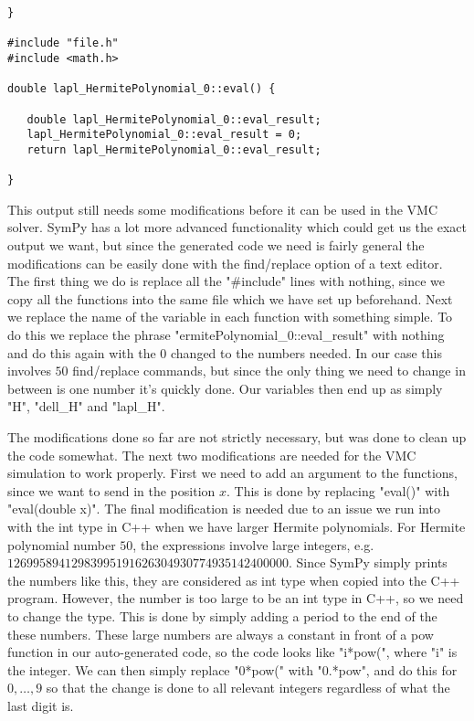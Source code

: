 \documentclass[../main.tex]{subfiles}
\begin{document}
\begin{appendices}
\begin{lstlisting}[caption={}, style=Bash]
}

#include "file.h"
#include <math.h>

double lapl_HermitePolynomial_0::eval() {

   double lapl_HermitePolynomial_0::eval_result;
   lapl_HermitePolynomial_0::eval_result = 0;
   return lapl_HermitePolynomial_0::eval_result;

}

\end{lstlisting}
This output still needs some modifications before it can be used in the VMC solver. SymPy has a lot more advanced functionality which could get us the exact output we want, but since the generated code we need is fairly general the modifications can be easily done with the find/replace option of a text editor. The first thing we do is replace all the "\#include" lines with nothing, since we copy all the functions into the same file which we have set up beforehand. Next we replace the name of the variable in each function with something simple. To do this we replace the phrase "ermitePolynomial\_0::eval\_result" with nothing and do this again with the $0$ changed to the numbers needed. In our case this involves $50$ find/replace commands, but since the only thing we need to change in between is one number it's quickly done. Our variables then end up as simply "H", "dell\_H" and "lapl\_H".

The modifications done so far are not strictly necessary, but was done to clean up the code somewhat. The next two modifications are needed for the VMC simulation to work properly. First we need to add an argument to the functions, since we want to send in the position $x$. This is done by replacing "eval()" with "eval(double x)". The final modification is needed due to an issue we run into with the int type in C++ when we have larger Hermite polynomials. For Hermite polynomial number $50$, the expressions involve large integers, e.g. $12699589412983995191626304930774935142400000$. Since SymPy simply prints the numbers like this, they are considered as int type when copied into the C++ program. However, the number is too large to be an int type in C++, so we need to change the type. This is done by simply adding a period to the end of the these numbers. These large numbers are always a constant in front of a pow function in our auto-generated code, so the code looks like "i*pow(", where "i" is the integer. We can then simply replace "0*pow(" with "0.*pow", and do this for $0,\dots,9$ so that the change is done to all relevant integers regardless of what the last digit is.


\end{appendices}
\end{document}
